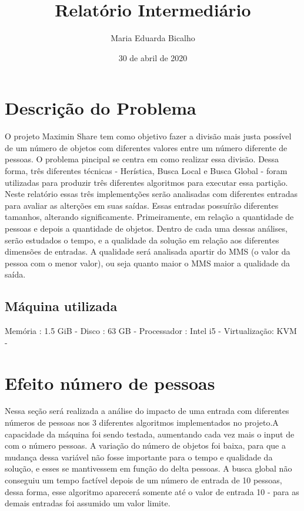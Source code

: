 \documentclass[a4paper,11pt,final]{article}
\title{Relatório Intermediário}
\author{Maria Eduarda Bicalho}
\date{30 de abril de 2020}
\begin{document}
\maketitle

\section{Descrição do Problema}

    O projeto Maximin Share tem como objetivo fazer a divisão mais justa possível de um número de objetos com 
diferentes valores entre um número diferente de pessoas. O problema pincipal se centra em como realizar 
essa divisão. Dessa forma, três diferentes técnicas -  Herística, Busca Local e Busca Global - foram utilizadas 
para produzir três diferentes algoritmos para executar essa partição.
    Neste relatório essas três implementções serão analisadas com diferentes entradas para avaliar as
alterções em suas saídas. Essas entradas possuírão diferentes tamanhos, alterando significamente. 
Primeiramente, em relação a quantidade de pessoas e depois a quantidade de objetos. Dentro de cada uma dessas 
análises, serão estudados o tempo, e a qualidade da solução em relação aos diferentes dimensões de entradas.
A qualidade será analisada apartir do MMS (o valor da pessoa com o menor valor), ou seja quanto maior o MMS 
maior a qualidade da saída.


\subsection{Máquina utilizada}

Memória :  1.5 GiB  -
  Disco : 63 GB  -
  Processador : Intel i5 -
  Virtualização: KVM  -


\section{Efeito número de pessoas}

   Nessa seção será realizada a análise do impacto de uma entrada com diferentes números de pessoas
nos 3 diferentes algoritmos implementados no projeto.A capacidade da máquina foi sendo testada,
aumentando cada vez mais o input de com o número pessoas. A variação do número de objetos foi baixa,
para que a mudança dessa variável não fosse importante para o tempo e qualidade da solução, e esses 
se mantivessem em função do delta pessoas. A busca global não conseguiu um tempo factível depois 
de um número de entrada de 10 pessoas, dessa forma, esse algoritmo aparecerá somente até o valor 
de entrada 10 - para as demais entradas foi assumido um valor limite. 
\end{document}
